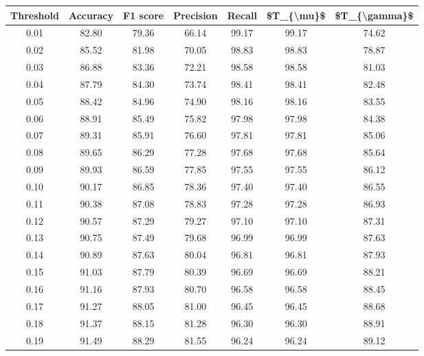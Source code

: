 \begin{tabular}{|c|c|c|c|c|c|c|}
\toprule
 Threshold &  Accuracy &  F1 score &  Precision &  Recall &  \$T\_\{\textbackslash mu\}\$ &  \$T\_\{\textbackslash gamma\}\$ \\
\hline
      0.01 &     82.80 &     79.36 &      66.14 &   99.17 &      99.17 &         74.62 \\
      0.02 &     85.52 &     81.98 &      70.05 &   98.83 &      98.83 &         78.87 \\
      0.03 &     86.88 &     83.36 &      72.21 &   98.58 &      98.58 &         81.03 \\
      0.04 &     87.79 &     84.30 &      73.74 &   98.41 &      98.41 &         82.48 \\
      0.05 &     88.42 &     84.96 &      74.90 &   98.16 &      98.16 &         83.55 \\
      0.06 &     88.91 &     85.49 &      75.82 &   97.98 &      97.98 &         84.38 \\
      0.07 &     89.31 &     85.91 &      76.60 &   97.81 &      97.81 &         85.06 \\
      0.08 &     89.65 &     86.29 &      77.28 &   97.68 &      97.68 &         85.64 \\
      0.09 &     89.93 &     86.59 &      77.85 &   97.55 &      97.55 &         86.12 \\
      0.10 &     90.17 &     86.85 &      78.36 &   97.40 &      97.40 &         86.55 \\
      0.11 &     90.38 &     87.08 &      78.83 &   97.28 &      97.28 &         86.93 \\
      0.12 &     90.57 &     87.29 &      79.27 &   97.10 &      97.10 &         87.31 \\
      0.13 &     90.75 &     87.49 &      79.68 &   96.99 &      96.99 &         87.63 \\
      0.14 &     90.89 &     87.63 &      80.04 &   96.81 &      96.81 &         87.93 \\
      0.15 &     91.03 &     87.79 &      80.39 &   96.69 &      96.69 &         88.21 \\
      0.16 &     91.16 &     87.93 &      80.70 &   96.58 &      96.58 &         88.45 \\
      0.17 &     91.27 &     88.05 &      81.00 &   96.45 &      96.45 &         88.68 \\
      0.18 &     91.37 &     88.15 &      81.28 &   96.30 &      96.30 &         88.91 \\
      0.19 &     91.49 &     88.29 &      81.55 &   96.24 &      96.24 &         89.12 \\

\end{tabular}

